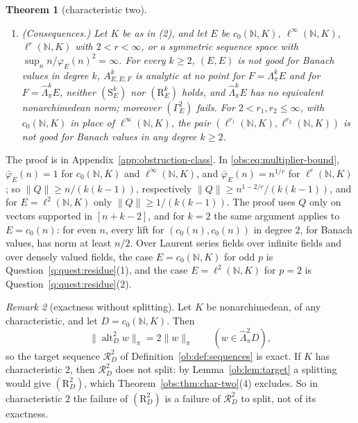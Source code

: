 \documentclass[11pt]{amsart}
\newtheorem{theorem}{Theorem}[section]
\theoremstyle{definition}
\theoremstyle{remark}
\newtheorem{remark}[theorem]{Remark}
\numberwithin{equation}{section}
\newcommand{\N}{\mathbb N}
\newcommand{\norm}[1]{\lVert #1\rVert}
\theoremstyle{plain}
\theoremstyle{definition}
\theoremstyle{plain}
\newcommand{\alt}{\operatorname{alt}}
\newcommand{\hLambda}{\widehat\Lambda}
\newcommand{\cR}{\mathcal R}
\begin{document}
\begin{theorem}[characteristic two]
\begin{enumerate}
$\widehat\otimes{}^2_\pi E$ onto $\widehat\Gamma{}^2_\pi E$ has $\norm{R_2}\ge n/\bar\varphi_E(n)^2$. For the
corresponding maps of $c_0(n)$ the bounds are $n-1$, $\lfloor n/2\rfloor$ and $n$.
\item \textup{(Consequences.)} Let $K$ be as in \textup{(2)}, and let $E$ be $c_0(\N,K)$, $\ell^\infty(\N,K)$,
$\ell^r(\N,K)$ with $2<r<\infty$, or a symmetric sequence space with $\sup_nn/\varphi_E(n)^2=\infty$. For every
$k\ge2$, $(E,E)$ is not good for Banach values in degree $k$, $A^k_{E,E;F}$ is analytic at no point for
$F=\Lambda^k_\pi E$ and for $F=\widehat\Lambda^k_\pi E$, neither $(\mathrm S^k_E)$ nor $(\mathrm R^k_E)$ holds, and
$\widehat\Lambda^k_\pi E$ has no equivalent nonarchimedean norm; moreover $(\Gamma^2_E)$ fails. For
$2<r_1,r_2\le\infty$, with $c_0(\N,K)$ in place of
$\ell^\infty(\N,K)$, the pair $(\ell^{r_1}(\N,K),\ell^{r_2}(\N,K))$ is not good for Banach values in
any degree $k\ge2$.
\end{enumerate}
\end{theorem}

The proof is in Appendix~\ref{app:obstruction-class}. In \eqref{obs:eq:multiplier-bound}, $\bar\varphi_E(n)=1$ for
$c_0(\N,K)$ and $\ell^\infty(\N,K)$, and $\bar\varphi_E(n)=n^{1/r}$ for $\ell^r(\N,K)$; so $\norm Q\ge n/(k(k-1))$,
respectively $\norm Q\ge n^{1-2/r}/(k(k-1))$, and for $E=\ell^2(\N,K)$ only $\norm Q\ge1/(k(k-1))$. The proof uses
$Q$ only on vectors supported in $[n+k-2]$, and for $k=2$ the same argument applies to $E=c_0(n)$: for even $n$, every
lift for $(c_0(n),c_0(n))$ in degree $2$, for Banach values, has norm at least $n/2$. Over Laurent series fields over
infinite fields and over densely valued fields, the case $E=c_0(\N,K)$ for odd $p$ is Question~\ref{q:quest:residue}(1),
and the case $E=\ell^2(\N,K)$ for $p=2$ is Question~\ref{q:quest:residue}(2).

\begin{remark}[exactness without splitting]\label{obs:rem:c0-exact}
Let $K$ be nonarchimedean, of any characteristic, and let $D=c_0(\N,K)$. Then
\begin{equation}\label{obs:eq:alt-isometry}
 \norm{\alt^2_Dw}_\pi=2\norm w_\pi\qquad(w\in\hLambda^2_\pi D),
\end{equation}
so the target sequence $\cR^2_D$ of Definition~\ref{ob:def:sequences} is exact. If $K$ has characteristic $2$, then
$\cR^2_D$ does not split: by Lemma~\ref{ob:lem:target} a splitting would give $(\mathrm R^2_D)$, which
Theorem~\ref{obs:thm:char-two}(4) excludes. So in characteristic $2$ the failure of $(\mathrm R^2_D)$ is a failure of
$\cR^2_D$ to split, not of its exactness.
\end{remark}
\end{document}

